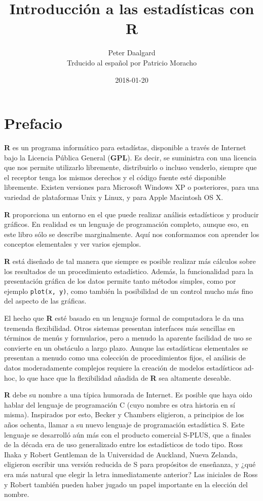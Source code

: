 \documentclass[spanish]{extbook}
\title{Introducción a las estadísticas con R}
\date{2018-01-20}
\author{Peter Daalgard\\\small{Trducido al español por Patricio Moracho}}
\numberwithin{equation}{section}
\numberwithin{figure}{section}
\begin{document}
\maketitle
\cleardoublepage
{}
\tableofcontents

\chapter*{Prefacio}

\textbf{R} es un programa informático para estadístas, disponible a través de
Internet bajo la Licencia Pública General (\textbf{GPL}). Es decir, se
suministra con una licencia que nos permite utilizarlo libremente, distribuirlo
o incluso venderlo, siempre que el receptor tenga los mismos derechos y el
código fuente esté disponible libremente. Existen versiones para Microsoft
Windows XP o posteriores, para una variedad de plataformas Unix y Linux, y para
Apple Macintosh OS X. 

\textbf{R} proporciona un entorno en el que puede realizar análisis
estadísticos y producir gráficos.  En realidad es un lenguaje de programación
completo, aunque eso, en este libro sólo se describe marginalmente. Aquí nos
conformamos con aprender los conceptos elementales y ver varios ejemplos. 

\textbf{R} está diseñado de tal manera que siempre es posible realizar más
cálculos sobre los resultados de un procedimiento estadístico. Además, la
funcionalidad para la presentación gráfica de los datos permite tanto métodos
simples, como por ejemplo \texttt{plot(x, y)}, como también la posibilidad de
un control mucho más fino del aspecto de las gráficas. 

El hecho que \textbf{R} esté basado en un lenguaje formal de computadora le da
una tremenda flexibilidad.  Otros sistemas presentan interfaces más sencillas
en términos de menús y formularios, pero a menudo la aparente facilidad de uso
se convierte en un obstáculo a largo plazo. Aunque las estadísticas elementales
se presentan a menudo como una colección de procedimientos fijos, el análisis
de datos moderadamente complejos requiere la creación de modelos estadísticos
ad-hoc, lo que hace que la flexibilidad añadida de \textbf{R} sea altamente
deseable.

\textbf{R} debe su nombre a una típica humorada de Internet. Es posible que
haya oido hablar del lenguaje de programación C (cuyo nombre es otra historia
en sí misma). Inspirados por esto, Becker y Chambers eligieron, a principios de
los años ochenta, llamar a su nuevo lenguaje de programación estadística S.
Este lenguaje se desarrolló aún más con el producto comercial S-PLUS, que a
finales de la década era de uso generalizado entre los estadísticos de todo
tipo. Ross Ihaka y Robert Gentleman de la Universidad de Auckland, Nueva
Zelanda, eligieron escribir una versión reducida de S para propósitos de
enseñanza, y ¿qué era más natural que elegir la letra inmediatamente anterior?
Las iniciales de Ross y Robert también pueden haber jugado un papel importante
en la elección del nombre.
\end{document}
